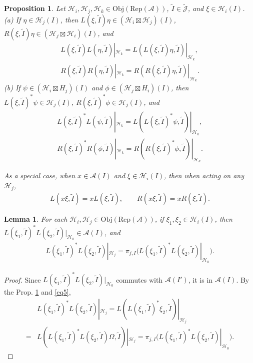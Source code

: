 \documentclass[11pt,b5paper,notitlepage]{article}
\theoremstyle{definition}
\theoremstyle{plain}
\newtheorem{pp}[df]{Proposition}
\newtheorem{lm}[df]{Lemma}
\newcommand{\mc}{\mathcal}
\newcommand{\wtd}{\widetilde}
\newcommand{\Jtd}{\widetilde{\mathcal J}}
\newcommand{\RepA}{\mathrm{Rep}(\mathcal A)}
\newcommand{\Obj}{\mathrm{Obj}}
\numberwithin{equation}{section}
\begin{document}
\begin{pp}\label{lb1}
Let $\mc H_i,\mc H_j,\mc H_k\in\Obj(\RepA)$, $\wtd I\in\Jtd$, and $\xi\in\mc H_i(I)$.\\
(a) If $\eta\in\mc H_j(I)$, then $L(\xi,\wtd I)\eta\in(\mc H_i\boxtimes\mc H_j)(I)$, $R(\xi,\wtd I)\eta\in(\mc H_j\boxtimes\mc H_i)(I)$, and
\begin{gather}
L(\xi,\wtd I)L(\eta,\wtd I)|_{\mc H_k}=L(L(\xi,\wtd I)\eta,\wtd I)|_{\mc H_k},\\
R(\xi,\wtd I)R(\eta,\wtd I)|_{\mc H_k}=R(R(\xi,\wtd I)\eta,\wtd I)|_{\mc H_k}.
\end{gather}
(b) If $\psi\in(\mc H_i\boxtimes H_j)(I)$ and $\phi\in (\mc H_j\boxtimes H_i)(I)$, then $L(\xi,\wtd I)^*\psi\in\mc H_j(I)$, $R(\xi,\wtd I)^*\phi\in\mc H_j(I)$, and
\begin{gather}
L(\xi,\wtd I)^*L(\psi,\wtd I)|_{\mc H_k}=L(L(\xi,\wtd I)^*\psi,\wtd I)|_{\mc H_k},\\
R(\xi,\wtd I)^*R(\phi,\wtd I)|_{\mc H_k}=R(R(\xi,\wtd I)^*\phi,\wtd I)|_{\mc H_k}.
\end{gather}

As a special case, when $x\in\mc A(I)$ and $\xi\in\mc H_i(I)$, then when acting on any $\mc H_j$,
\begin{align}
L(x\xi,\wtd I)=xL(\xi,\wtd I),\qquad R(x\xi,\wtd I)=xR(\xi,\wtd I).\label{eq11}	
\end{align}
\end{pp}

\begin{lm}\label{lb4}
For each $\mc H_i,\mc H_j\in\Obj(\RepA)$, if $\xi_1,\xi_2\in\mc H_i(I)$, then $L(\xi_1,\wtd I)^*L(\xi_2,\wtd I)|_{\mc H_0}\in\mc A(I)$, and
\begin{align}
L(\xi_1,\wtd I)^*L(\xi_2,\wtd I)|_{\mc H_j}=\pi_{j,I}\big(L(\xi_1,\wtd I)^*L(\xi_2,\wtd I)|_{\mc H_0}\big).	\label{eq8}
\end{align}
\end{lm}

\begin{proof}
Since $L(\xi_1,\wtd I)^*L(\xi_2,\wtd I)|_{\mc H_0}$ commutes with $\mc A(I')$, it  is in $\mc A(I)$. By the Prop. \ref{lb1} and \eqref{eq5}, 
\begin{align*}
&L(\xi_1,\wtd I)^*L(\xi_2,\wtd I)|_{\mc H_j}=L(L(\xi_1,\wtd I)^*\xi_2,\wtd I)|_{\mc H_j}\\	=&L(L(\xi_1,\wtd I)^*L(\xi_2,\wtd I)\Omega,\wtd I)|_{\mc H_j}=\pi_{j,I}\big(L(\xi_1,\wtd I)^*L(\xi_2,\wtd I)|_{\mc H_0}\big).	
\end{align*}
\end{proof}
\end{document}

